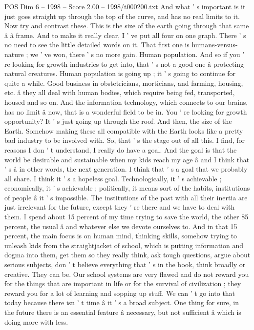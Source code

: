 \begin{textsample}{POS Dim 6 – 1998 – Score 2.00 – 1998/t000200.txt}
And what ' s important is it just goes straight up through the top of the curve, and has no real limits to it.
Now try and contrast these.
This is the size of the earth going through that same â â frame.
And to make it really clear, I ' ve put all four on one graph.
There ' s no need to see the little detailed words on it.
That first one is humans-versus-nature ; we ' ve won, there ' s no more gain.
Human population.
And so if you ' re looking for growth industries to get into, that ' s not a good one â protecting natural creatures.
Human population is going up ; it ' s going to continue for quite a while.
Good business in obstetricians, morticians, and farming, housing, etc. â they all deal with human bodies, which require being fed, transported, housed and so on.
And the information technology, which connects to our brains, has no limit â now, that is a wonderful field to be in.
You ' re looking for growth opportunity?
It ' s just going up through the roof.
And then, the size of the Earth.
Somehow making these all compatible with the Earth looks like a pretty bad industry to be involved with.
So, that ' s the stage out of all this.
I find, for reasons I don ' t understand, I really do have a goal.
And the goal is that the world be desirable and sustainable when my kids reach my age â and I think that ' s â in other words, the next generation.
I think that ' s a goal that we probably all share.
I think it ' s a hopeless goal.
Technologically, it ' s achievable ; economically, it ' s achievable ; politically, it means sort of the habits, institutions of people â it ' s impossible.
The institutions of the past with all their inertia are just irrelevant for the future, except they ' re there and we have to deal with them.
I spend about 15 percent of my time trying to save the world, the other 85 percent, the usual â and whatever else we devote ourselves to.
And in that 15 percent, the main focus is on human mind, thinking skills, somehow trying to unleash kids from the straightjacket of school, which is putting information and dogma into them, get them so they really think, ask tough questions, argue about serious subjects, don ' t believe everything that ' s in the book, think broadly or creative.
They can be.
Our school systems are very flawed and do not reward you for the things that are important in life or for the survival of civilization ; they reward you for a lot of learning and sopping up stuff.
We can ' t go into that today because there isn ' t time â it ' s a broad subject.
One thing for sure, in the future there is an essential feature â necessary, but not sufficient â which is doing more with less.

\end{textsample}
